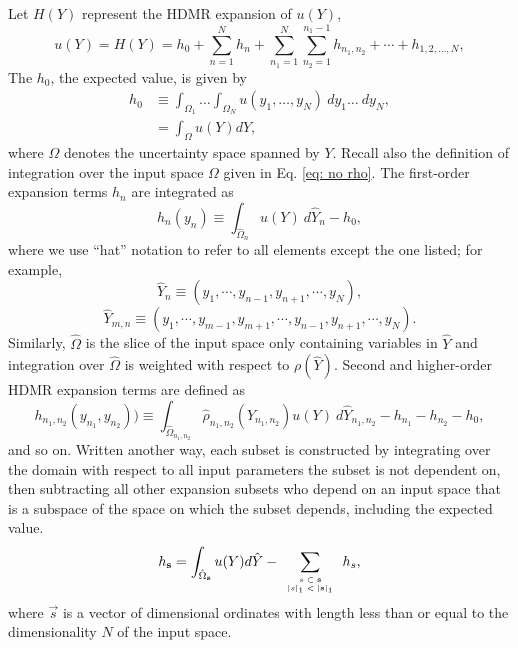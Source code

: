 Let $H(Y)$
represent the HDMR expansion of $u(Y)$,
\begin{equation}\label{eq:anova}
  u(Y) = H(Y) = h_0 + \sum_{n=1}^N h_n + \sum_{n_1=1}^N \sum_{n_2=1}^{n_1-1} h_{n_1,n_2} + \cdots +
  h_{1,2,\ldots,N},
\end{equation}
The $h_0$, the expected value, is given by
\begin{align}\label{eq:hdmr 0}
  h_0 &\equiv \int_{\Omega_1} \ldots\int_{\Omega_N} u(y_1,\ldots,y_N)\ dy_1\ldots\ dy_N, \\
    &= \int_\Omega u(Y) dY,
\end{align}
where $\Omega$ denotes the uncertainty space spanned by $Y$.
Recall also the definition of integration over the input space $\Omega$ given in Eq. \ref{eq: no rho}.  The first-order 
expansion terms $h_n$ are integrated as
\begin{equation}\label{eq:hdmr 1}
  h_n(y_n) \equiv \int_{\hat\Omega_n} u(Y)\ d\hat Y_n - h_0,
\end{equation}
where we use ``hat'' notation to refer to all elements except the one listed; for example,
\begin{equation}
  \hat Y_n \equiv (y_1,\cdots,y_{n-1},y_{n+1},\cdots,y_N),
\end{equation}
\begin{equation}
  \hat Y_{m,n} \equiv (y_1,\cdots,y_{m-1},y_{m+1},\cdots,y_{n-1},y_{n+1},\cdots,y_N).
\end{equation}
Similarly, $\hat\Omega$ is the slice of the input space only containing variables in $\hat Y$ and integration
over $\hat\Omega$ is weighted with respect to $\rho(\hat Y)$.
Second and higher-order HDMR expansion terms are defined as
\begin{equation}\label{eq:hdmr 2}
  h_{n_1,n_2}(y_{n_1},y_{n_2})) \equiv \int_{\hat\Omega_{n_1,n_2}} \hat\rho_{n_1,n_2}(\hat Y_{n_1,n_2}) u(Y)\
      d\hat Y_{n_1,n_2} - h_{n_1} - h_{n_2} - h_0,
\end{equation}
and so on.  Written another way, each subset is constructed by integrating over the domain with respect to all
input parameters the subset is not dependent on, then subtracting all other expansion subsets who depend on an
input space that is a subspace of the space on which the subset depends, including the expected value.
\begin{equation}
  h_{\vec s} = \int_{\hat\Omega_{\vec s}} u(Y)d\hat Y - \mlsum{s \subset \vec s\\|s|_1<|\vec s|_1}{} h_s,
\end{equation}
where $\vec s$ is a vector of dimensional ordinates with length less than or equal to the dimensionality $N$
of the input space.

